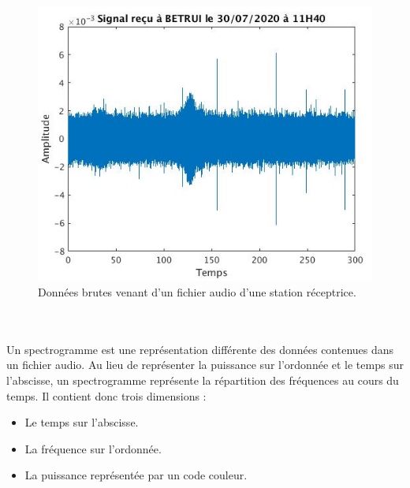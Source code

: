 \documentclass[11pt]{article}
\begin{document}
\begin{figure}[t] %
    \begin{center}
        \includegraphics[scale=0.5]{wav_brut.png}
        \caption{Données brutes venant d'un fichier audio d'une station réceptrice.}
        \label{fig:wav_brut}
    \end{center}
\end{figure}
\\
\\
Un spectrogramme est une représentation différente des données contenues dans un fichier audio.
Au lieu de représenter la puissance sur l'ordonnée et le temps sur l'abscisse, un spectrogramme représente la répartition des fréquences au cours du temps.
Il contient donc trois dimensions :
\begin{itemize}
    \item Le temps sur l'abscisse.
    \item La fréquence sur l'ordonnée.
    \item La puissance représentée par un code couleur.\\
\end{itemize}
\end{document}
